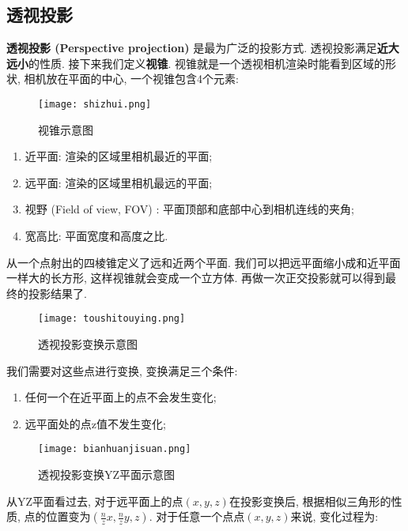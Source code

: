 \documentclass[openany]{progbookcn}
\begin{document}
\subsection{透视投影}

\textbf{透视投影 (Perspective projection) }是最为广泛的投影方式. 透视投影满足\textbf{近大远小}的性质. 接下来我们定义\textbf{视锥}. 视锥就是一个透视相机渲染时能看到区域的形状, 相机放在平面的中心, 一个视锥包含4个元素: 

\begin{figure}[H]
	\centering
	\texttt{[image: shizhui.png]}
	\caption{视锥示意图}
	\label{fig:projection}
\end{figure}

\begin{enumerate}
	\item 近平面: 渲染的区域里相机最近的平面; 
	\item 远平面: 渲染的区域里相机最远的平面; 
	\item 视野 (Field of view, FOV) : 平面顶部和底部中心到相机连线的夹角; 
	\item 宽高比: 平面宽度和高度之比. 
\end{enumerate}

从一个点射出的四棱锥定义了远和近两个平面. 我们可以把远平面缩小成和近平面一样大的长方形, 这样视锥就会变成一个立方体. 再做一次正交投影就可以得到最终的投影结果了. 

\begin{figure}[H]
	\centering
	\texttt{[image: toushitouying.png]}
	\caption{透视投影变换示意图}
	\label{fig:projection}
\end{figure}

我们需要对这些点进行变换, 变换满足三个条件: 
\begin{enumerate}
	\item 任何一个在近平面上的点不会发生变化; 
	\item 远平面处的点z值不发生变化; 
\end{enumerate}

\begin{figure}[H]
	\centering
	\texttt{[image: bianhuanjisuan.png]}
	\caption{透视投影变换YZ平面示意图}
	\label{fig:projection}
\end{figure}

从YZ平面看过去, 对于远平面上的点$(x,y,z)$在投影变换后, 根据相似三角形的性质, 点的位置变为$(\frac{n}{z}x,\frac{n}{z}y,z)$. 对于任意一个点点$(x,y,z)$来说, 变化过程为: 
\end{document}
